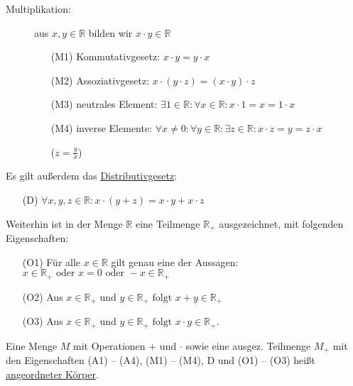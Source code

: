 \documentclass[12pt,a4paper,leqno]{article}
\begin{document}
\begin{description}
\begin{description}
        \item[Multiplikation:] aus $x, y \in \mathbb{R}$ bilden wir $x\cdot y\in \mathbb{R}$
          \begin{itemize}
            \item[(M1)] Kommutativgesetz: $x \cdot y = y \cdot x$
            \item[(M2)] Assoziativgesetz: $x \cdot (y \cdot z) = (x \cdot y) \cdot z$
            \item[(M3)] neutrales Element: $\exists 1 \in \mathbb{R} : \forall x \in \mathbb{R} : x \cdot 1 = x = 1 \cdot x$
            \item[(M4)] inverse Elemente: $\forall x \neq 0 : \forall y \in \mathbb{R} : \exists z \in \mathbb{R} : x \cdot z = y = z \cdot x$ \begin{flushright}
                ($z = \frac{y}{x}$)
              \end{flushright}
          \end{itemize}
      \end{description}
      
    \item Es gilt außerdem das \underline{Distributivgesetz}:
      \begin{itemize}
        \item[(D)] $\forall x, y, z \in \mathbb{R} : x \cdot (y + z) = x \cdot y + x \cdot z$
      \end{itemize}
      
    \item Weiterhin ist in der Menge $\mathbb{R}$ eine Teilmenge $\mathbb{R}_+$ ausgezeichnet, mit folgenden Eigenschaften:
      \begin{itemize}
        \item[(O1)] Für alle $x \in \mathbb{R}$ gilt genau eine der Aussagen: \\ 
          $x \in \mathbb{R}_+ \textrm{ oder } x=0  \textrm{ oder } -x \in  \mathbb{R}_+$
        \item[(O2)] Aus  $x \in \mathbb{R}_+ \textrm{ und } y \in \mathbb{R}_+ \textrm{ folgt } x + y \in \mathbb{R}_+$
        \item[(O3)] Aus $x \in \mathbb{R}_+ \textrm{ und } y \in \mathbb{R}_+ \textrm{ folgt } x \cdot y \in \mathbb{R}_+$.
      \end{itemize}
      
    \item[Bem:] Eine Menge $M$ mit Operationen $+$ und $ \cdot $ sowie eine ausgez. Teilmenge 
      $M_+$ mit den Eigenschaften (A1) -- (A4), (M1) -- (M4), D und (O1) -- (O3) heißt \underline{angeordneter Körper}. \\
      
  \end{description}
\end{document}
